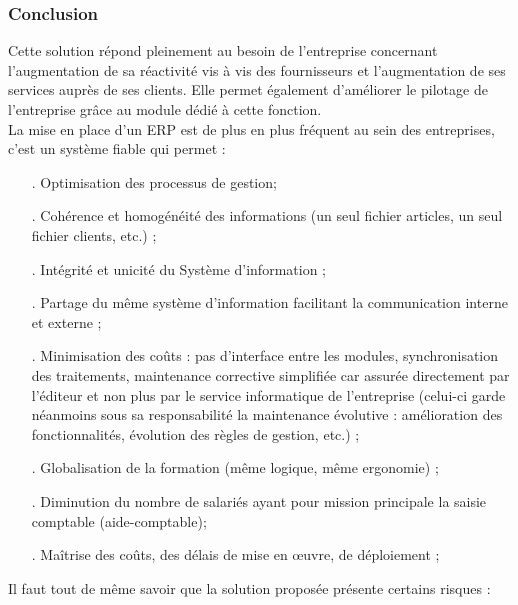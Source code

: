 \subsubsection{Conclusion}
Cette solution répond pleinement au besoin de l'entreprise concernant l'augmentation de sa réactivité vis à vis des fournisseurs et l'augmentation de ses services auprès de ses clients. Elle permet également d'améliorer le pilotage de l'entreprise grâce au module dédié à cette fonction.\\
La mise en place d'un ERP est de plus en plus fréquent au sein des entreprises, c'est un système fiable qui permet : 
\begin{itemize}
\item[.]Optimisation des processus de gestion;
\item[.]Cohérence et homogénéité des informations (un seul fichier articles, un seul fichier clients, etc.) ;
\item[.]Intégrité et unicité du Système d'information ;
\item[.]Partage du même système d’information facilitant la communication interne et externe ;
\item[.]Minimisation des coûts : pas d’interface entre les modules, synchronisation des traitements, maintenance corrective simplifiée car assurée directement par l'éditeur et non plus par le service informatique de l'entreprise (celui-ci garde néanmoins sous sa responsabilité la maintenance évolutive : amélioration des fonctionnalités, évolution des règles de gestion, etc.) ;
\item[.]Globalisation de la formation (même logique, même ergonomie) ;
\item[.]Diminution du nombre de salariés ayant pour mission principale la saisie comptable (aide-comptable);
\item[.]Maîtrise des coûts, des délais de mise en œuvre, de déploiement ;\\
\end{itemize}

Il faut tout de même savoir que la solution proposée présente certains risques : 

